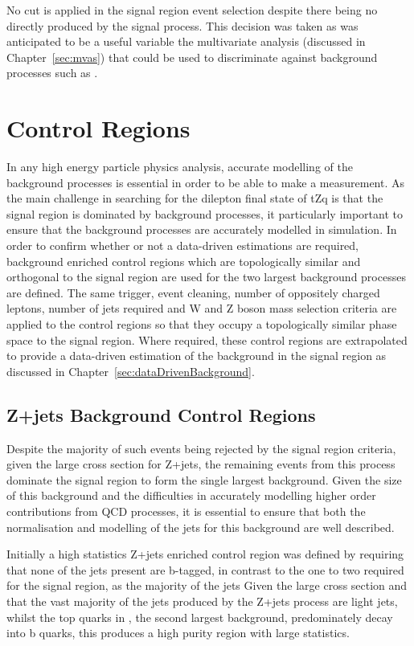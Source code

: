 No \MET cut is applied in the signal region event selection despite there being no \MET directly produced by the signal process.
This decision was taken as \MET was anticipated to be a useful variable the multivariate analysis (discussed in Chapter~\ref{sec:mvas}) that could be used to discriminate against background processes such as \ttbar.

\section{Control Regions}\label{sec:controlRegions}
In any high energy particle physics analysis, accurate modelling of the background processes is essential in order to be able to make a measurement.
As the main challenge in searching for the dilepton final state of tZq is that the signal region is dominated by background processes, it particularly important to ensure that the background processes are accurately modelled in simulation.
In order to confirm whether or not a data-driven estimations are required, background enriched control regions which are topologically similar and orthogonal to the signal region are used for the two largest background processes are defined.
The same trigger, event cleaning, number of oppositely charged leptons, number of jets required and W and Z boson mass selection criteria are applied to the control regions so that they occupy a topologically similar phase space to the signal region.
Where required, these control regions are extrapolated to provide a data-driven estimation of the background in the signal region as discussed in Chapter~\ref{sec:dataDrivenBackground}.

\subsection{Z+jets Background Control Regions}\label{subsec:zPlusJetsCR}
Despite the majority of such events being rejected by the signal region criteria, given the large cross section for Z+jets, the remaining events from this process dominate the signal region to form the single largest background.
Given the size of this background and the difficulties in accurately modelling higher order contributions from QCD processes, it is essential to ensure that both the normalisation and modelling of the jets for this background are well described.

Initially a high statistics Z+jets enriched control region was defined by requiring that none of the jets present are b-tagged, in contrast to the one to two required for the signal region, as the majority of the jets 
Given the large cross section and that the vast majority of the jets produced by the Z+jets process are light jets, whilst the top quarks in \ttbar, the second largest background, predominately decay into b quarks, this produces a high purity region with large statistics.

